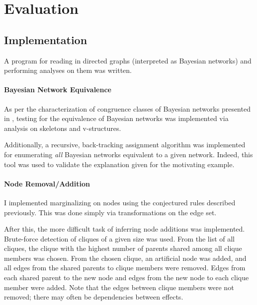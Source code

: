 \documentclass{article}
\begin{document}
	
	
	
	
	\section{Evaluation}
	\label{evaluation}
	
	\subsection{Implementation}
	
	A program for reading in directed graphs (interpreted as Bayesian networks) and performing analyses on them was written.
	
	\paragraph{Bayesian Network Equivalence}
	As per the characterization of congruence classes of Bayesian networks presented in \cite{verma2013equivalence,chickering2013transformational}, testing for the equivalence of Bayesian networks was implemented via analysis on skeletons and v-structures.
	
	Additionally, a recursive, back-tracking assignment algorithm was implemented for enumerating \emph{all} Bayesian networks equivalent to a given network.
	Indeed, this tool was used to validate the explanation given for the motivating example.
	
	\paragraph{Node Removal/Addition}
	I implemented marginalizing on nodes using the conjectured rules described previously. This was done simply via transformations on the edge set.
	
	After this, the more difficult task of inferring node additions was implemented.
	Brute-force detection of cliques of a given size was used.
	From the list of all cliques, the clique with the highest number of parents shared among all clique members was chosen.
	From the chosen clique, an artificial node was added, and all edges from the shared parents to clique members were removed.
	Edges from each shared parent to the new node and edges from the new node to each clique member were added.
	Note that the edges between clique members were not removed; there may often be dependencies between effects.
	
\end{document}
